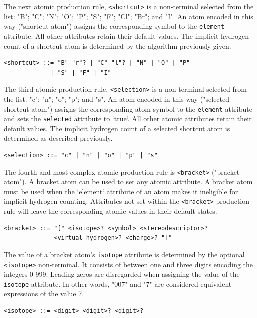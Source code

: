 \documentclass{article}
\def\ttt{\texttt}
\begin{document}
The next atomic production rule, \ttt{<shortcut>} is a non-terminal selected from the list: "B"; "C"; "N"; "O"; "P"; "S"; "F"; "Cl"; "Br"; and "I". An atom encoded in this way ("shortcut atom") assigns the corresponding symbol to the \ttt{element} attribute. All other attributes retain their default values. The implicit hydrogen count of a shortcut atom is determined by the algorithm previously given.

\begin{lstlisting}
<shortcut> ::= "B" "r"? | "C" "l"? | "N" | "O" | "P"
             | "S" | "F" | "I"
\end{lstlisting}

The third atomic production rule, \ttt{<selection>} is a non-terminal selected from the list: "c"; "n"; "o"; "p"; and "s". An atom encoded in this way ("selected shortcut atom") assigns the corresponding atom symbol to the \ttt{element} attribute and sets the \ttt{selected} attribute to `true`. All other atomic attributes retain their default values. The implicit hydrogen count of a selected shortcut atom is determined as described previously.

\begin{lstlisting}
<selection> ::= "c" | "n" | "o" | "p" | "s"
\end{lstlisting}

The fourth and most complex atomic production rule is \ttt{<bracket>} ("bracket atom"). A bracket atom can be used to set any atomic attribute. A bracket atom must be used when the `element` attribute of an atom makes it ineligible for implicit hydrogen counting. Attributes not set within the \ttt{<bracket>} production rule will leave the corresponding atomic values in their default states.

\begin{lstlisting}
<bracket> ::= "[" <isotope>? <symbol> <stereodescriptor>?
              <virtual_hydrogen>? <charge>? "]"
\end{lstlisting}

The value of a bracket atom's \ttt{isotope} attribute is determined by the optional \ttt{<isotope>} non-terminal. It consists of between one and three digits encoding the integers 0-999. Leading zeros are disregarded when assigning the value of the \ttt{isotope} attribute. In other words, "007" and "7" are considered equivalent expressions of the value 7.

\begin{lstlisting}
<isotope> ::= <digit> <digit>? <digit>?
\end{lstlisting}
\end{document}

